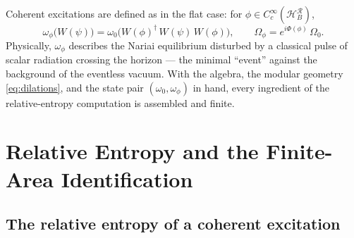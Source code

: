 \documentclass[11pt]{article}
\newcommand{\Nariai}{Nariai}
\begin{document}
Coherent excitations are defined as in the flat case: for $\phi \in C_c^\infty(\mathcal{H}_B^{\mathcal{R}})$,
\begin{equation}
\omega_\phi\big(W(\psi)\big) = \omega_0\big(W(\phi)^\dagger\, W(\psi)\, W(\phi)\big),
\qquad
\Omega_\phi = e^{i\Phi(\phi)}\,\Omega_0 .
\label{eq:coherent}
\end{equation}
Physically, $\omega_\phi$ describes the \Nariai{} equilibrium disturbed by a classical pulse of scalar radiation crossing the horizon --- the minimal ``event'' against the background of the eventless vacuum. With the algebra, the modular geometry \eqref{eq:dilations}, and the state pair $(\omega_0, \omega_\phi)$ in hand, every ingredient of the relative-entropy computation is assembled and finite.

\section{Relative Entropy and the Finite-Area Identification}
\label{sec:entropy}

\subsection{The relative entropy of a coherent excitation}
\end{document}
